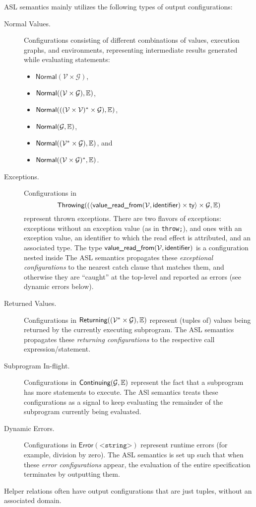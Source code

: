 \documentclass{book}
\newcommand\XGraphs[0]{\mathcal{G}}
\newcommand\vals[0]{\mathcal{V}}
\newcommand\valuereadfrom[0]{\textsf{value\_read\_from}}
\newcommand\Normal[0]{\textsf{Normal}}
\newcommand\Throwing[0]{\textsf{Throwing}}
\newcommand\Continuing[0]{\textsf{Continuing}}
\newcommand\Returning[0]{\textsf{Returning}}
\newcommand\Error[0]{\textsf{Error}}
\begin{document}
ASL semantics mainly utilizes the following types of output configurations:
\begin{description}
  \item[Normal Values.] Configurations consisting of different combinations of values,
  execution graphs, and environments, representing intermediate results
  generated while evaluating statements:
  \begin{itemize}
  \item $\Normal(\vals \times \XGraphs)$,
  \item $\Normal((\vals \times \XGraphs), \envs)$,
  \item $\Normal(((\vals \times \vals)^* \times \XGraphs), \envs)$,
  \item $\Normal(\XGraphs, \envs)$,
  \item $\Normal((\vals^* \times \XGraphs), \envs)$, and
  \item $\Normal((\vals\times\XGraphs)^*, \envs)$.
  \end{itemize}

  \item[Exceptions.] Configurations in
  \[
    \Throwing((\langle \valuereadfrom(\vals,\identifier) \times \ty\rangle \times \XGraphs, \envs)
  \]
  represent thrown exceptions.
  There are two flavors of exceptions:
  exceptions without an exception value (as in \texttt{throw;}), and ones with an exception value,
  an identifier to which the read effect is attributed, and an associated type.
  The type $\valuereadfrom(\vals,\identifier)$ is a configuration nested inside
  The ASL semantics propagates these \emph{exceptional configurations} to the nearest catch clause that matches
  them, and otherwise they are ``caught'' at the top-level and reported as errors (see dynamic errors below).

  \item[Returned Values.] Configurations in $\Returning((\vals^* \times \XGraphs), \envs)$
  represent (tuples of) values being returned by the currently executing subprogram.
  The ASL semantics propagates these \emph{returning configurations} to the respective call expression/statement.

  \item[Subprogram In-flight.] Configurations in $\Continuing(\XGraphs, \envs)$
  represent the fact that a subprogram has more statements to execute.
  The ASl semantics treats these configurations as a signal to keep evaluating the remainder
  of the subprogram currently being evaluated.

  \item[Dynamic Errors.] Configurations in $\Error(\texttt{<string>})$
  represent runtime errors (for example, division by zero).
  The ASL semantics is set up such that when these \emph{error configurations} appear,
  the evaluation of the entire specification terminates by outputting them.
\end{description}
Helper relations often have output configurations that are just tuples, without an associated domain.
\end{document}
